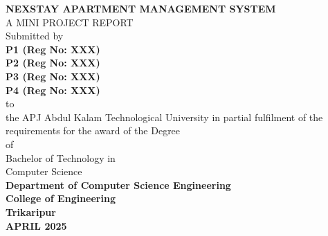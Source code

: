 \documentclass[12pt,a4paper]{report}
\begin{document}
\begin{titlepage}
    \begin{center}
        \vspace*{1cm}
        \Large{\textbf{NEXSTAY APARTMENT MANAGEMENT SYSTEM}}\\
        \vspace{1.5cm}
        \normalsize{A MINI PROJECT REPORT}\\
        \vspace{0.5cm}
        Submitted by\\
        \vspace{0.5cm}
        \textbf{P1 (Reg No: XXX)}\\
        \textbf{P2 (Reg No: XXX)}\\
        \textbf{P3 (Reg No: XXX)}\\
        \textbf{P4 (Reg No: XXX)}\\
        \vspace{1.5cm}
        to\\
        \vspace{0.5cm}
        the APJ Abdul Kalam Technological University in partial fulfilment of the requirements for the award of the Degree\\
        of\\
        Bachelor of Technology in\\
        Computer Science\\
        \vspace{2cm}
        \textbf{Department of Computer Science Engineering}\\
        \textbf{College of Engineering}\\
        \textbf{Trikaripur}\\
        \textbf{APRIL 2025}
    \end{center}
\end{titlepage}


\end{document}
